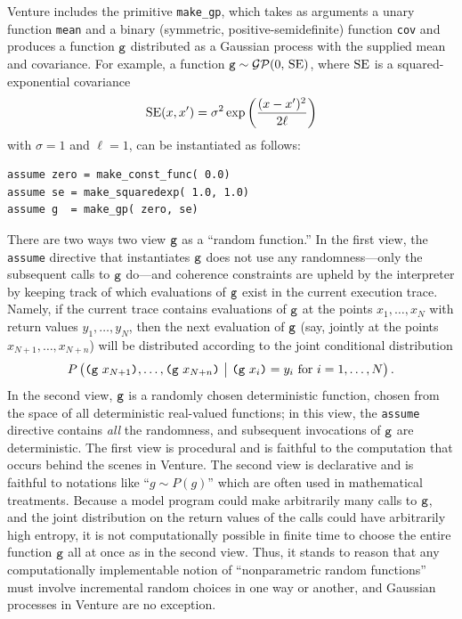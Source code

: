 Venture includes the primitive \texttt{make\_gp}, which takes as arguments a
unary function \texttt{mean} and a binary (symmetric, positive-semidefinite)
function \texttt{cov} and produces a function $\texttt{g}$ distributed as a Gaussian
process with the supplied mean and covariance.  For example, a function $\texttt{g}
\sim \mathcal{GP}(0,\,\operatorname{SE})$, where $\operatorname{SE}$ is a squared-exponential covariance
\[ \operatorname{SE}(x, x') = \sigma^2 \exp\left( \frac{(x-x')^2}{2\ell} \right) \]
with $\sigma=1$ and $\ell=1$, can be instantiated as follows:
\begin{lstlisting}[language=Venture]
assume zero = make_const_func( 0.0)
assume se = make_squaredexp( 1.0, 1.0)
assume g  = make_gp( zero, se)
\end{lstlisting}
There are two ways two view $\texttt{g}$ as a ``random function.'' In the first view,
the \texttt{assume} directive that instantiates $\texttt{g}$ does not use any
randomness---only the subsequent calls to $\texttt{g}$ do---and coherence constraints
are upheld by the interpreter by keeping track of which evaluations of $\texttt{g}$
exist in the current execution trace.  Namely, if the current trace contains evaluations
of $\texttt{g}$ at the points $x_1,\ldots,x_N$ with return values $y_1,\ldots,y_N$,
then the next evaluation of $\texttt{g}$ (say, jointly at the points $x_{N+1}, \ldots,
x_{N+n}$) will be distributed according to the joint conditional distribution
\[
  P\left( \big.
    \texttt(\texttt{g}\ x_{N+1}\texttt), \ldots, \texttt(\texttt{g}\ x_{N+n}\texttt)
    \ \middle\vert\ 
    \texttt(\texttt{g}\ x_i\texttt) = y_i \text{ for $i=1,\ldots,N$} \right).
\]
In the second view, $\texttt{g}$ is a randomly chosen deterministic function, chosen
from the space of all deterministic real-valued functions; in this view, the
\texttt{assume} directive contains \emph{all} the randomness, and subsequent
invocations of $\texttt{g}$ are deterministic.  The first view is procedural and is
faithful to the computation that occurs behind the scenes in Venture.  The
second view is declarative and is faithful to notations like ``$g \sim P(g)$''
which are often used in mathematical treatments.  Because a model program could
make arbitrarily many calls to $\texttt{g}$, and the joint distribution on the return
values of the calls could have arbitrarily high entropy, it is not
computationally possible in finite time to choose the entire function $\texttt{g}$ all
at once as in the second view.  Thus, it stands to reason that any
computationally implementable notion of ``nonparametric random functions'' must
involve incremental random choices in one way or another, and Gaussian processes
in Venture are no exception.
